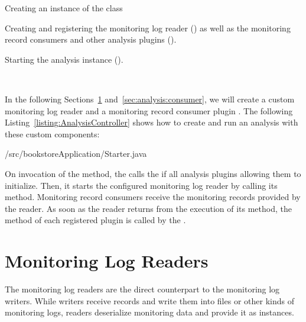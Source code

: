 \begin{compactenum}
\item Creating an instance of the  class
\item Creating and registering the monitoring log reader () as %
well as the monitoring record consumers and other analysis plugins ().
\item Starting the analysis instance ().
\end{compactenum}

\

\noindent In the following Sections~\ref{sec:analysis:reader} and~\ref{sec:analysis:consumer}, %
we will create a custom monitoring log reader  and a %
monitoring record consumer plugin . %
\noindent The following Listing~\ref{listing:AnalysisController} shows how to create and run an analysis %
with these custom components:

\setJavaCodeListing
%
{\customComponentsBookstoreApplicationDir/src/bookstoreApplication/Starter.java}

\noindent On invocation of the  method, the  %
calls the  if all analysis plugins allowing them to initialize. %
Then, it starts the configured monitoring log reader by calling its  %
method. Monitoring record consumers receive the monitoring records provided by %
the reader. As soon as the reader returns from the execution of its  
method, the method  of each registered plugin is called by the %
.

\section{Monitoring Log Readers}\label{sec:analysis:reader}

The monitoring log readers are the direct counterpart to the monitoring log %
writers. While writers receive records and write them into files or other kinds %
of monitoring logs, readers deserialize monitoring data and provide it as %
 instances. 

